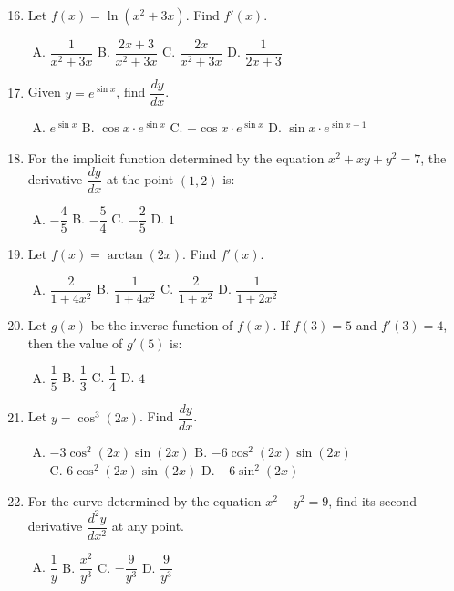 \documentclass[11pt,a4paper]{article}
\begin{document}
\begin{enumerate}[1.]
    \setcounter{enumi}{15}
    \item Let $f(x) = \ln(x^2 + 3x)$. Find $f'(x)$.
    \begin{enumerate}[A.]
        \item $\dfrac{1}{x^2 + 3x}$ \qquad B. $\dfrac{2x + 3}{x^2 + 3x}$ \qquad C. $\dfrac{2x}{x^2 + 3x}$ \qquad D. $\dfrac{1}{2x+3}$
    \end{enumerate}

    \item Given $y = e^{\sin x}$, find $\dfrac{dy}{dx}$.
    \begin{enumerate}[A.]
        \item $e^{\sin x}$ \qquad B. $\cos x \cdot e^{\sin x}$ \qquad C. $-\cos x \cdot e^{\sin x}$ \qquad D. $\sin x \cdot e^{\sin x - 1}$
    \end{enumerate}

    \item For the implicit function determined by the equation $x^2 + xy + y^2 = 7$, the derivative $\dfrac{dy}{dx}$ at the point $(1, 2)$ is:
    \begin{enumerate}[A.]
        \item $-\dfrac{4}{5}$ \qquad B. $-\dfrac{5}{4}$ \qquad C. $-\dfrac{2}{5}$ \qquad D. $1$
    \end{enumerate}

    \item Let $f(x) = \arctan(2x)$. Find $f'(x)$.
    \begin{enumerate}[A.]
        \item $\dfrac{2}{1 + 4x^2}$ \qquad B. $\dfrac{1}{1 + 4x^2}$ \qquad C. $\dfrac{2}{1 + x^2}$ \qquad D. $\dfrac{1}{1 + 2x^2}$
    \end{enumerate}

    \item Let $g(x)$ be the inverse function of $f(x)$. If $f(3) = 5$ and $f'(3) = 4$, then the value of $g'(5)$ is:
    \begin{enumerate}[A.]
        \item $\dfrac{1}{5}$ \qquad B. $\dfrac{1}{3}$ \qquad C. $\dfrac{1}{4}$ \qquad D. $4$
    \end{enumerate}

    \item Let $y = \cos^3(2x)$. Find $\dfrac{dy}{dx}$.
    \begin{enumerate}[A.]
        \item $-3\cos^2(2x)\sin(2x)$ \qquad B. $-6\cos^2(2x)\sin(2x)$ \\ C. $6\cos^2(2x)\sin(2x)$ \qquad D. $-6\sin^2(2x)$
    \end{enumerate}

    \item For the curve determined by the equation $x^2 - y^2 = 9$, find its second derivative $\dfrac{d^2y}{dx^2}$ at any point.
    \begin{enumerate}[A.]
        \item $\dfrac{1}{y}$ \qquad B. $\dfrac{x^2}{y^3}$ \qquad C. $-\dfrac{9}{y^3}$ \qquad D. $\dfrac{9}{y^3}$
    \end{enumerate}
\end{enumerate}
\end{document}
